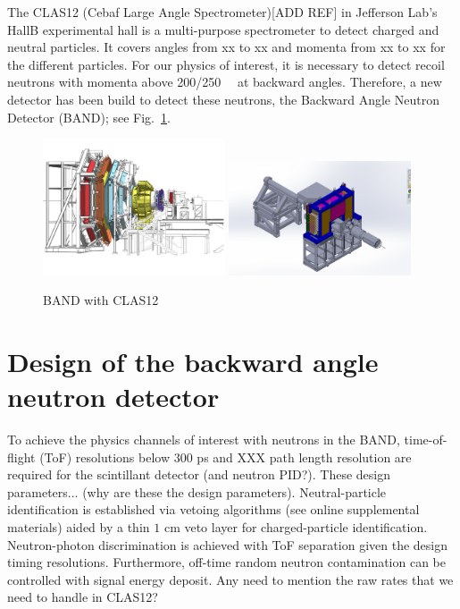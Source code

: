 \documentclass[review]{elsarticle}
\begin{document}
The CLAS12 (Cebaf Large Angle Spectrometer)[ADD REF] in Jefferson Lab's HallB experimental hall is a multi-purpose spectrometer to detect charged and neutral particles. It covers angles from xx to xx and momenta from xx to xx for the different particles. For our physics of interest, it is necessary to detect recoil neutrons with momenta above \SI{200/250}{\mega\eVperc} at backward angles. Therefore, a new detector has been build to detect these neutrons, the Backward Angle Neutron Detector (BAND); see Fig.~\ref{fig:clas12}.

\begin{figure}[h]
	\centering
	\includegraphics[width=0.48\textwidth]{BandInClas.pdf}
	\includegraphics[width=0.48\textwidth]{BandInContext1.png}
		\caption{BAND with CLAS12}
		\label{fig:clas12}
\end{figure}



\section{Design of the backward angle neutron detector}
To achieve the physics channels of interest with neutrons in the BAND, time-of-flight (ToF) resolutions below $300$ \si{\pico\second} and XXX path length 
resolution are required for the scintillant detector {\color{red}(and neutron PID?)}. {\color{red}These design parameters... (why are these the 
design parameters)}. Neutral-particle identification is established via vetoing algorithms ({\color{red}see online supplemental materials}) aided by
a thin $1$ \si{\centi\meter} veto layer for charged-particle identification. Neutron-photon discrimination is achieved with ToF separation given the design 
timing resolutions. Furthermore, off-time random neutron contamination can be controlled with signal energy deposit. {\color{red} Any need to mention 
the raw rates that we need to handle in CLAS12?} 
\end{document}
